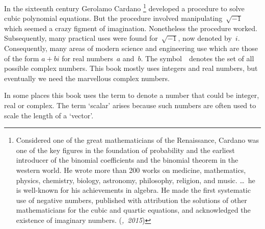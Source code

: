 In the sixteenth century Gerolamo Cardano%
\footnote{Considered one of the great mathematicians of the Renaissance, Cardano was one of the key figures in the foundation of probability and the earliest introducer of the binomial coefficients and the binomial theorem in the western world. He wrote more than 200 works on medicine, mathematics, physics, chemistry, biology, astronomy, philosophy, religion, and music. 
\ldots\ he is well-known for his achievements in algebra. He made the first systematic use of negative numbers, published with attribution the solutions of other mathematicians for the cubic and quartic equations, and acknowledged the existence of imaginary numbers. 
\hfill\mbox{(\emph{, 2015})}}
developed a procedure to solve cubic polynomial equations.
But the procedure involved manipulating~\(\sqrt{-1}\) which seemed a crazy figment of imagination.
Nonetheless the procedure worked.
Subsequently, many practical uses were found for~\(\sqrt{-1}\), now denoted by~\(i\).
Consequently, many areas of modern science and engineering use  which are those of the form \(a+bi\) for real numbers~\(a\) and~\(b\).
The symbol~\CC\ denotes the set of all possible complex numbers.
This book mostly uses integers and real numbers, but eventually we need the marvellous complex numbers.

In some places this book uses the term  to denote a number that could be integer, real or complex.
The term `scalar' arises because such numbers are often used to scale the length of a `vector'.


